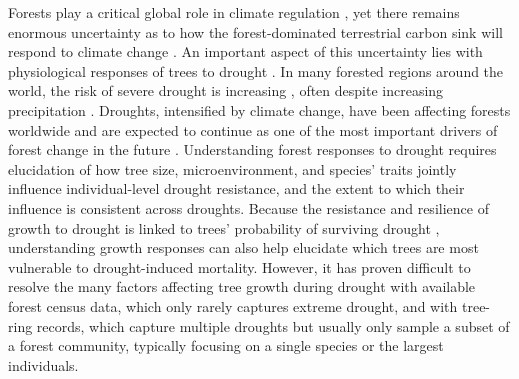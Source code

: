\documentclass[
]{article}
\begin{document}
Forests play a critical global role in climate regulation
\citep{bonan_forests_2008}, yet there remains enormous uncertainty as to
how the forest-dominated terrestrial carbon sink will respond to climate
change \citep{friedlingstein_climatecarbon_2006}. An important aspect of
this uncertainty lies with physiological responses of trees to drought
\citep{kennedy_implementing_2019}. In many forested regions around the
world, the risk of severe drought is increasing
\citep{trenberth_global_2014, dai_climate_2018}, often despite
increasing precipitation
\citep{intergovernmental_panel_on_climate_change_climate_2015, cook_unprecedented_2015}.
Droughts, intensified by climate change, have been affecting forests
worldwide and are expected to continue as one of the most important
drivers of forest change in the future
\citep{allen_global_2010, allen_underestimation_2015}. Understanding
forest responses to drought requires elucidation of how tree size,
microenvironment, and species' traits jointly influence individual-level
drought resistance, and the extent to which their influence is
consistent across droughts. Because the resistance and resilience of
growth to drought is linked to trees' probability of surviving drought
\citep{desoto_low_2020, liu_hydraulic_2019}, understanding growth
responses can also help elucidate which trees are most vulnerable to
drought-induced mortality. However, it has proven difficult to resolve
the many factors affecting tree growth during drought with available
forest census data, which only rarely captures extreme drought, and with
tree-ring records, which capture multiple droughts but usually only
sample a subset of a forest community, typically focusing on a single
species or the largest individuals.
\end{document}
